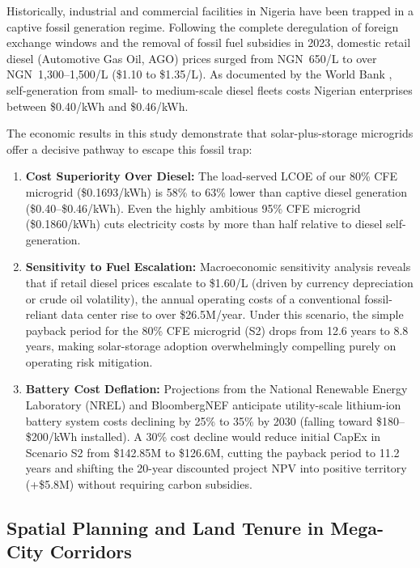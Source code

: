 \documentclass[11pt,a4paper]{article}
\begin{document}
Historically, industrial and commercial facilities in Nigeria have been trapped in a captive fossil generation regime. Following the complete deregulation of foreign exchange windows and the removal of fossil fuel subsidies in 2023, domestic retail diesel (Automotive Gas Oil, AGO) prices surged from NGN~650/L to over NGN~1,300--1,500/L (\$1.10 to \$1.35/L). As documented by the World Bank \cite{WorldBank2020}, self-generation from small- to medium-scale diesel fleets costs Nigerian enterprises between \$0.40/kWh and \$0.46/kWh.

The economic results in this study demonstrate that solar-plus-storage microgrids offer a decisive pathway to escape this fossil trap:
\begin{enumerate}
    \item \textbf{Cost Superiority Over Diesel:} The load-served LCOE of our 80\% CFE microgrid (\$0.1693/kWh) is 58\% to 63\% lower than captive diesel generation (\$0.40--\$0.46/kWh). Even the highly ambitious 95\% CFE microgrid (\$0.1860/kWh) cuts electricity costs by more than half relative to diesel self-generation.
    \item \textbf{Sensitivity to Fuel Escalation:} Macroeconomic sensitivity analysis reveals that if retail diesel prices escalate to \$1.60/L (driven by currency depreciation or crude oil volatility), the annual operating costs of a conventional fossil-reliant data center rise to over \$26.5M/year. Under this scenario, the simple payback period for the 80\% CFE microgrid (S2) drops from 12.6 years to 8.8 years, making solar-storage adoption overwhelmingly compelling purely on operating risk mitigation.
    \item \textbf{Battery Cost Deflation:} Projections from the National Renewable Energy Laboratory (NREL) and BloombergNEF anticipate utility-scale lithium-ion battery system costs declining by 25\% to 35\% by 2030 (falling toward \$180--\$200/kWh installed). A 30\% cost decline would reduce initial CapEx in Scenario S2 from \$142.85M to \$126.6M, cutting the payback period to 11.2 years and shifting the 20-year discounted project NPV into positive territory (+\$5.8M) without requiring carbon subsidies.
\end{enumerate}

\subsection{Spatial Planning and Land Tenure in Mega-City Corridors}
\label{subsec:spatial_planning}
\end{document}
